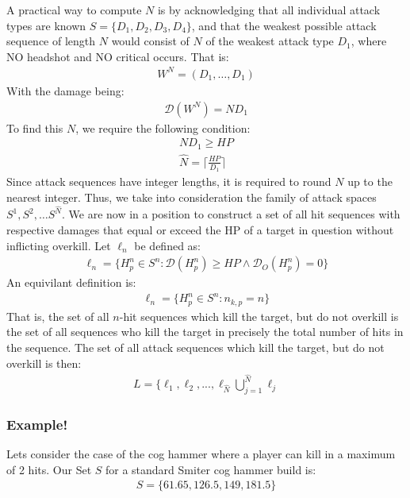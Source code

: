 \documentclass{article}
\begin{document}
      A practical way to compute $N$ is by acknowledging that all individual attack types are known $S=\{D_1,D_2,D_3,D_4\}$, and that the weakest possible attack sequence of length $N$ would consist of $N$ of the weakest attack type $D_1$, where NO headshot and NO critical occurs. That is:
\begin{align*}
W^N=(D_1,\ldots ,D_1)
\end{align*}
With the damage being:
\begin{align*}
\mathcal{D} (W^N)= N D_1
\end{align*}
    To find this $N$, we require the following condition:
\begin{align*}
    N D_1 \geq HP \\
    \hat{N} = \lceil \frac{HP}{D_1}  \rceil
\end{align*}
    Since attack sequences have integer lengths, it is required to round $N$ up to the nearest integer.
    Thus, we take into consideration the family of attack spaces $S^1, S^2,\ldots S^{\hat{N}}$. We are now in a position to construct a set of all hit sequences with respective damages that equal or exceed the HP of a target in question without inflicting overkill. Let $\ell_n$ be defined as:
\begin{align*}
\ell_n=\{H^n_p \in S^n : \mathcal{D} (H^n_p)\geq HP \wedge \mathcal{D}_O (H^n_p)=0\} 
\end{align*}    
An equivilant definition is:
\begin{align*}
\ell_n=\{H^n_p \in S^n : n_{k,p}=n\}
\end{align*}
    That is, the set of all $n$-hit sequences which kill the target, but do not overkill is the set of all sequences who kill the target in precisely the total number of hits in the sequence.
    The set of all attack sequences which kill the target, but do not overkill is then:
\begin{align*}
L = \{ \ell_1, \ell_2,...,\ell_{\hat{N}} \bigcup^{\hat{N}}_{j=1}\ell_j
\end{align*}
\subsubsection{Example!}
Lets consider the case of the cog hammer where a player can kill in a maximum of 2 hits. Our Set $S$ for a standard Smiter cog hammer build is:
\begin{align*}
S = \{61.65, 126.5 , 149, 181.5\}
\end{align*}
\end{document}
